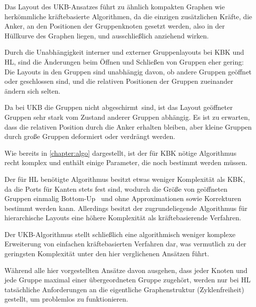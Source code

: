 Das Layout des UKB-Ansatzes führt zu ähnlich kompakten Graphen wie herkömmliche kräftebasierte Algorithmen, da die einzigen zusätzlichen Kräfte, die Anker, an den Positionen der Gruppenknoten gesetzt werden, also in der Hüllkurve des Graphen liegen, und ausschließlich anziehend wirken.

Durch die Unabhängigkeit interner und externer Gruppenlayouts bei KBK und HL, sind die Änderungen beim Öffnen und Schließen von Gruppen eher gering: Die Layouts in den Gruppen sind unabhängig davon, ob andere Gruppen geöffnet oder geschlossen sind, und die relativen Positionen der Gruppen zueinander ändern sich selten.

Da bei UKB die Gruppen nicht \glqq abgeschirmt\grqq\ sind, ist das Layout geöffneter Gruppen sehr stark vom Zustand anderer Gruppen abhängig. Es ist zu erwarten, dass die relativen Position durch die Anker erhalten bleiben, aber kleine Gruppen durch große Gruppen deformiert oder verdrängt werden.

Wie bereits in \autoref{chapter:algo} dargestellt, ist der für KBK nötige Algorithmus recht komplex und enthält einige Parameter, die noch bestimmt werden müssen.

Der für HL benötigte Algorithmus besitzt etwas weniger Komplexität als KBK, da die Ports für Kanten stets fest sind, wodurch die Größe von geöffneten Gruppen einmalig \glqq Bottom-Up \grqq\
und ohne Approximationen sowie Korrekturen bestimmt werden kann. Allerdings besitzt der zugrundeliegende Algorithmus für hierarchische Layouts eine höhere Komplexität als kräftebasierende Verfahren.

Der UKB-Algorithmus stellt schließlich eine algorithmisch weniger komplexe Erweiterung von einfachen kräftebasierten Verfahren dar, was vermutlich zu der geringsten Komplexität unter den hier verglichenen Ansätzen führt.

Während alle hier vorgestellten Ansätze davon ausgehen, dass jeder Knoten und jede Gruppe maximal einer übergeordneten Gruppe zugehört, werden nur bei HL tatsächliche Anforderungen an die eigentliche Graphenstruktur (Zyklenfreiheit) gestellt, um problemlos zu funktionieren.

